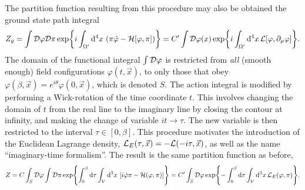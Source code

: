 The partition function resulting from this procedure may also be obtained the ground state path integral
\begin{equation*}
    Z_g
    =\int \mathcal{D}\varphi\mathcal{D}\pi
    \exp{i \int_{\Omega'} \dd^4 x \, \left(\pi\dot\varphi - \mathcal{H}[\varphi, \pi]\right)}
    = C' \int \mathcal{D} \varphi(x)
    \exp{i \int_{\Omega'} \dd^4 x \, \mathcal{L}[\varphi, \partial_\mu \varphi]}.
\end{equation*}
The domain of the functional integral $\int \mathcal{D} \varphi$ is restricted from \emph{all} (smooth enough) field configurations $\varphi(t, \vec x)$, to only those that obey $\varphi(\beta, \vec x) = e^{i\theta} \varphi(0, \vec x) $, which is denoted $S$.
The action integral is modified by performing a Wick-rotation of the time coordinate $t$. 
This involves changing the domain of $t$ from the real line to the imaginary line by closing the contour at infinity, and making the change of variable $it \rightarrow \tau$.
The new variable is then restricted to the interval $\tau\in [0, \beta]$.
This procedure motivates the introduction of  the Euclidean Lagrange density, 
$\mathcal{L}_E(\tau, \vec x) = -\mathcal{L}(-i \tau, \vec x)$, as well as the name ``imaginary-time formalism''.
The result is the same partition function as before,
\begin{align*}
    Z = C \int_S \mathcal{D} \varphi \int \mathcal{D} \pi
    \exp{
        \int_0^\beta \dd \tau \int_V \dd^3x \, 
        \left[
            i\dot \varphi \pi
            - \mathcal{H}(\varphi, \pi)
        \right]
    } 
    =
    C' \int_S \mathcal{D} \varphi
    \exp{- \int_0^\beta \dd \tau \int_V \dd^3x \, \mathcal{L}_E(\varphi, \pi)}.
\end{align*}


